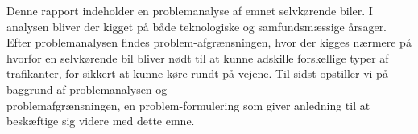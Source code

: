 Denne rapport indeholder en problemanalyse af emnet selvkørende biler. I analysen bliver der kigget på både teknologiske og samfundsmæssige årsager. Efter problemanalysen findes problem-afgrænsningen, hvor der kigges nærmere på hvorfor en selvkørende bil bliver nødt til at kunne adskille forskellige typer af trafikanter, for sikkert at kunne køre rundt på vejene. Til sidst opstiller vi på baggrund af problemanalysen og \\problemafgrænsningen, en problem-formulering som giver anledning til at beskæftige sig videre med dette emne.
